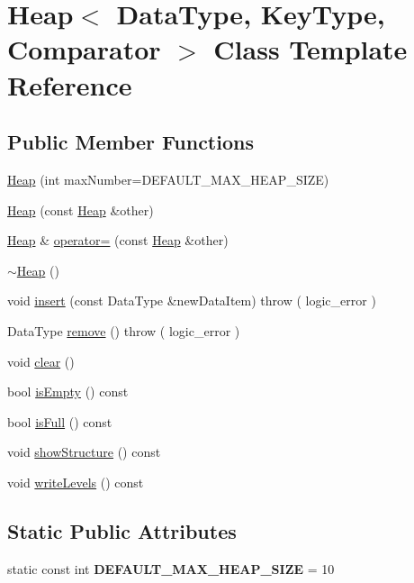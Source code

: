 \hypertarget{class_heap}{\section{Heap$<$ Data\+Type, Key\+Type, Comparator $>$ Class Template Reference}
\label{class_heap}
}
\subsection*{Public Member Functions}
\begin{DoxyCompactItemize}
\item 
\hyperlink{class_heap_ae17e34e3c86d88263a8fdf80b9ba78fc}{Heap} (int max\+Number=D\+E\+F\+A\+U\+L\+T\+\_\+\+M\+A\+X\+\_\+\+H\+E\+A\+P\+\_\+\+S\+I\+Z\+E)
\item 
\hyperlink{class_heap_a97e3b462be1c6af31d7519546bba8907}{Heap} (const \hyperlink{class_heap}{Heap} \&other)
\item 
\hyperlink{class_heap}{Heap} \& \hyperlink{class_heap_a5ed119341c39bcea1437321d4247dd40}{operator=} (const \hyperlink{class_heap}{Heap} \&other)
\item 
\hyperlink{class_heap_a555ade7891007de959bef0ee53e28767}{$\sim$\+Heap} ()
\item 
void \hyperlink{class_heap_aa68cf80454ab1b246fa723612805a91e}{insert} (const Data\+Type \&new\+Data\+Item)  throw ( logic\+\_\+error )
\item 
Data\+Type \hyperlink{class_heap_a4a18bfdacd897c45fc3da13f22b8930d}{remove} ()  throw ( logic\+\_\+error )
\item 
void \hyperlink{class_heap_a19a78c8eae2cf7c8253e34e54d86ed73}{clear} ()
\item 
bool \hyperlink{class_heap_ab8fa26d416ac0e27dfcbf18c54f8f73f}{is\+Empty} () const 
\item 
bool \hyperlink{class_heap_ac9111b884c74a376240e0155a788756e}{is\+Full} () const 
\item 
void \hyperlink{class_heap_a3ae1e1f27a145749c8b9f2da777cb8bc}{show\+Structure} () const 
\item 
void \hyperlink{class_heap_a4bdb1772ea92899de245d6cbd217d085}{write\+Levels} () const 
\end{DoxyCompactItemize}
\subsection*{Static Public Attributes}
\begin{DoxyCompactItemize}
\item 
\hypertarget{class_heap_a967c19732a20a72e8e824402ad6763c8}{static const int {\bfseries D\+E\+F\+A\+U\+L\+T\+\_\+\+M\+A\+X\+\_\+\+H\+E\+A\+P\+\_\+\+S\+I\+Z\+E} = 10}\label{class_heap_a967c19732a20a72e8e824402ad6763c8}

\end{DoxyCompactItemize}


